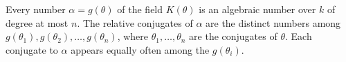Every number $\alpha = g(\theta)$ of the field $K(\theta)$ is an algebraic number over $k$ of degree at most $n$. The relative conjugates of $\alpha$ are the distinct numbers among $g(\theta_1), g(\theta_2), \ldots, g(\theta_n)$, where $\theta_1, \ldots, \theta_n$ are the conjugates of $\theta$. Each conjugate to $\alpha$ appears equally often among the $g(\theta_i)$.
